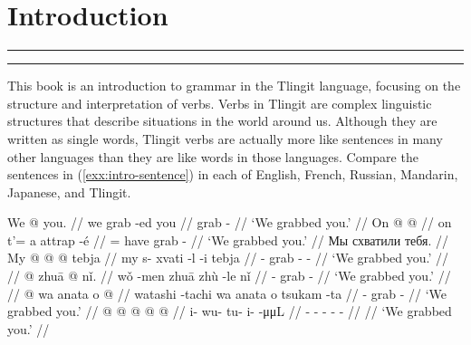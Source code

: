
\resetexcnt
\chapter{Introduction}\label{ch:intro}

\startcontents[chapters]
\noindent\rule[0.5em]{\textwidth}{\heavyrulewidth}
\noindent\rule{\textwidth}{\heavyrulewidth}
\vspace{1\baselineskip}


This book is an introduction to grammar in the Tlingit language, focusing on the structure and interpretation of verbs.
Verbs in Tlingit are complex linguistic structures that describe situations in the world around us.
Although they are written as single words, Tlingit verbs are actually more like sentences in many other languages than they are like words in those languages.
Compare the sentences in (\ref{exx:intro-sentence}) in each of English, French, Russian, Mandarin, Japanese, and Tlingit.

\pex\label{exx:intro-sentence}%
\a\label{ex:intro-sentence-english}%
%
\begingl
	\gla	We  @ {} you. //
	\glb	we grab -ed you //
	\glc	{} grab -  //
	\glft	‘We grabbed you.’
		//
\endgl
\a\label{ex:intro-sentence-french}%
%
\begingl
	\gla	On  @ {}  @ {} //
	\glb	on t’= a  attrap -é //
	\glc	{} = have grab - //
	\glft	‘We grabbed you.’
		//
\endgl
\a\label{ex:intro-sentence-russian}%
%
\begingl
	\glpreamble	Мы схватили тебя. //
	\gla	My  @ {} @ {} @ {} tebja //
	\glb	my s- xvati -l -i tebja //
	\glc	{} - grab - -  //
	\glft	‘We grabbed you.’
		//
\endgl
\a\label{ex:intro-sentence-mandarin}%
%
\begingl
	 //
	\gla	{} @ {} zhuā  @ {} nǐ. //
	\glb	wǒ -men zhuā zhù -le nǐ //
	\glc	{} - grab  -  //
	\glft	‘We grabbed you.’
		//
\endgl
\a\label{ex:intro-sentence-japanese}%
%
\begingl
	 //
	\gla	{} @ {} wa anata o  @ {} //
	\glb	watashi -tachi wa anata o tsukam -ta //
	\glc	{} -    grab - //
	\glft	‘We grabbed you.’
		//
\endgl
\a\label{ex:intro-sentence-tlingit}%
%
\begingl
	\gla	{} @ {} @ {} @ {} @ {} @ {} //
	\glb	i- wu- tu- i-  -μμL //
	\glc	{}- - - -  - //
	\gld	{} {} {} {} {} {} //
	\glft	‘We grabbed you.’
		//
\endgl
\xe

